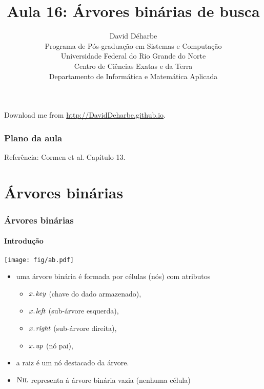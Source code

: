 \documentclass{beamer}
\title{Aula 16: Árvores binárias de busca}
\author{David Déharbe \\
  Programa de Pós-graduação em Sistemas e Computação \\
  Universidade Federal do Rio Grande do Norte \\
  Centro de Ciências Exatas e da Terra \\
  Departamento de Informática e Matemática Aplicada}
\date{}
\begin{document}
\begin{frame}
  \titlepage
  Download me from \url{http://DavidDeharbe.github.io}.
\end{frame}

\begin{frame}
  \frametitle{Plano da aula}
  \tableofcontents

  \alert{Referência}: Cormen et al. Capítulo 13.
\end{frame}

\section{Árvores binárias}

\begin{frame}

  \frametitle{Árvores binárias}
  \framesubtitle{Introdução}

  \begin{center}
    \texttt{[image: fig/ab.pdf]}
  \end{center}
  \begin{itemize}
    
  \item uma \alert{árvore binária} é formada por células (\alert{nós})
    com atributos
          
    \begin{itemize}

    \item $\attrib{x}{key}$ (chave do dado armazenado),

    \item $\attrib{x}{left}$ (sub-árvore esquerda),
      
    \item $\attrib{x}{right}$  (sub-árvore direita),
      
    \item $\attrib{x}{up}$ (nó pai),

    \end{itemize}

  \item a \alert{raiz} é um nó destacado da árvore.

  \item $\textnormal{\scshape Nil}$ representa á árvore binária vazia (nenhuma célula)

  \end{itemize}

\end{frame}
\end{document}
